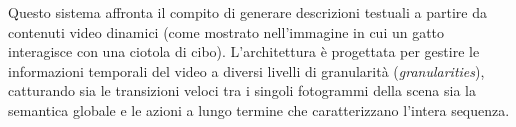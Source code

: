 ﻿\documentclass[11pt, a4paper]{article}
\begin{document}

Questo sistema affronta il compito di generare descrizioni testuali a partire da contenuti video dinamici (come mostrato nell'immagine in cui un gatto interagisce con una ciotola di cibo). L'architettura è progettata per gestire le informazioni temporali del video a diversi livelli di granularità (\emph{granularities}), catturando sia le transizioni veloci tra i singoli fotogrammi della scena sia la semantica globale e le azioni a lungo termine che caratterizzano l'intera sequenza.
\end{document}
